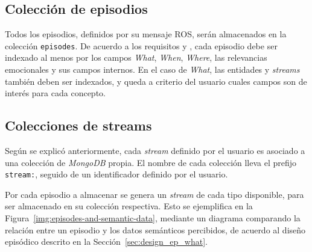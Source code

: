 \subsection{Colección de episodios}

Todos los episodios, definidos por su mensaje ROS, serán almacenados en la colección \texttt{episodes}. De acuerdo a los requisitos  y , cada episodio debe ser indexado al menos por los campos \textit{What}, \textit{When}, \textit{Where}, las relevancias emocionales y sus campos internos. En el caso de \textit{What}, las entidades y \textit{streams} también deben ser indexados, y queda a criterio del usuario cuales campos son de interés para cada concepto.

\subsection{Colecciones de streams}

Según se explicó anteriormente, cada \textit{stream} definido por el usuario es asociado a una colección de \textit{MongoDB} propia. El nombre de cada colección lleva el prefijo \texttt{stream:}, seguido de un identificador definido por el usuario.

Por cada episodio a almacenar se genera un \textit{stream} de cada tipo disponible, para ser almacenado en su colección respectiva. Esto se ejemplifica en la Figura~\ref{img:episodes-and-semantic-data}, mediante un diagrama comparando la relación entre un episodio y los datos semánticos percibidos, de acuerdo al diseño episódico descrito en la Sección~\ref{sec:design_ep_what}.

